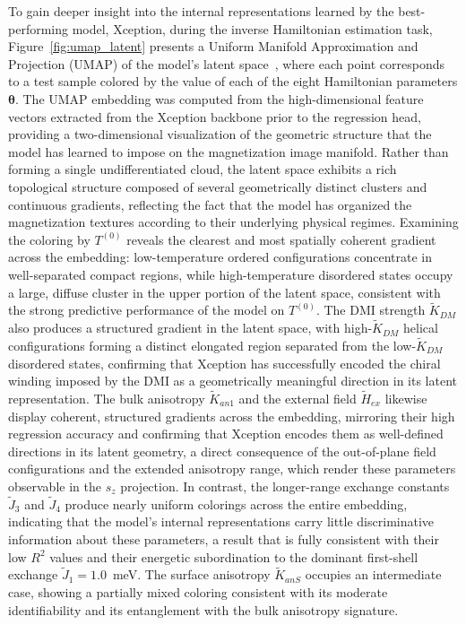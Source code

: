 \documentclass[final,5p,times,twocolumn]{elsarticle}
\begin{document}
To gain deeper insight into the internal representations learned by
the best-performing model, Xception, during the inverse Hamiltonian estimation task,
Figure~\ref{fig:umap_latent} presents a Uniform Manifold
Approximation and Projection (UMAP) of the model's latent
space~\cite{ghojogh2021uniform}, where each point corresponds to a
test sample colored by the value of each of the eight Hamiltonian
parameters $\boldsymbol{\theta}$. The UMAP embedding was computed
from the high-dimensional feature vectors extracted from the Xception
backbone prior to the regression head, providing a
two-dimensional visualization of the geometric structure that the
model has learned to impose on the magnetization image manifold. 
Rather than forming a single undifferentiated cloud, the latent 
space exhibits a rich topological structure composed of several 
geometrically distinct clusters and continuous gradients, reflecting 
the fact that the model has organized the magnetization textures 
according to their underlying physical regimes. Examining the 
coloring by $T^{(0)}$ reveals the clearest and most spatially 
coherent gradient across the embedding: low-temperature ordered 
configurations concentrate in well-separated compact regions, while 
high-temperature disordered states occupy a large, diffuse cluster 
in the upper portion of the latent space, consistent with the strong 
predictive performance of the model on $T^{(0)}$. The DMI strength 
$\tilde{K}_{DM}$ also produces a structured gradient in the latent 
space, with high-$\tilde{K}_{DM}$ helical configurations forming a 
distinct elongated region separated from the low-$\tilde{K}_{DM}$ 
disordered states, confirming that Xception has successfully encoded
the chiral winding imposed by the DMI as a geometrically meaningful
direction in its latent representation. The bulk anisotropy $\tilde{K}_{an1}$ and the external field
$\tilde{H}_{ex}$ likewise display coherent, structured gradients
across the embedding, mirroring their high regression accuracy and
confirming that Xception encodes them as well-defined directions in
its latent geometry,  a direct consequence of the out-of-plane
field configurations and the extended anisotropy range, which render
these parameters observable in the $s_z$ projection. In contrast, the
longer-range exchange constants $\tilde{J}_3$ and $\tilde{J}_4$
produce nearly uniform colorings across the entire embedding,
indicating that the model's internal representations carry little
discriminative information about these parameters,  a result that
is fully consistent with their low $R^2$ values and their energetic
subordination to the dominant first-shell exchange
$\tilde{J}_1 = 1.0$~meV. The surface anisotropy $\tilde{K}_{anS}$
occupies an intermediate case, showing a partially mixed coloring
consistent with its moderate identifiability and its entanglement
with the bulk anisotropy signature.
\end{document}

